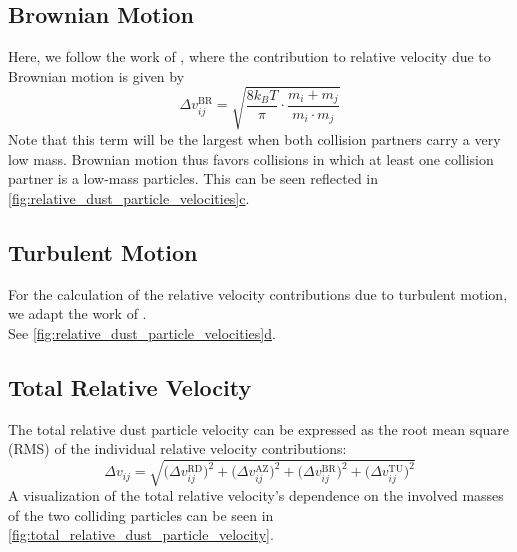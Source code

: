     \subsection{Brownian Motion}

        Here, we follow the work of \cite{dullemond_dominik_2004}, where the contribution to 
        relative velocity due to Brownian motion is given by
        \begin{equation}
            \Delta v_{ij}^\text{BR}
            =\sqrt{\frac{8k_BT}{\pi}\cdot\frac{m_i+m_j}{m_i\cdot m_j}}
        \end{equation}
        Note that this term will be the largest when both collision partners carry a very low mass.
        Brownian motion thus favors collisions in which at least one collision partner is a 
        low-mass particles. This can be seen reflected in 
        \hyperref[fig:relative_dust_particle_velocities]{
        \cref*{fig:relative_dust_particle_velocities}c}.

    \subsection{Turbulent Motion}

        For the calculation of the relative velocity contributions due to turbulent motion, we 
        adapt the work of \cite{ormel_cuzzi_2007}. \\

        See \hyperref[fig:relative_dust_particle_velocities]
        {\cref*{fig:relative_dust_particle_velocities}d}.

        

    \subsection{Total Relative Velocity}

        The total relative dust particle velocity can be expressed as the root mean square (RMS) of 
        the individual relative velocity contributions:
        \begin{equation}
            \Delta v_{ij}
                = \sqrt{
                    \big(\Delta v^\text{RD}_{ij}\big)^2
                    + \big(\Delta v^\text{AZ}_{ij}\big)^2
                    + \big(\Delta v^\text{BR}_{ij}\big)^2
                    + \big(\Delta v^\text{TU}_{ij}\big)^2
                }
        \end{equation}
        A visualization of the total relative velocity's dependence on the involved masses of the
        two colliding particles can be seen in \cref{fig:total_relative_dust_particle_velocity}.

